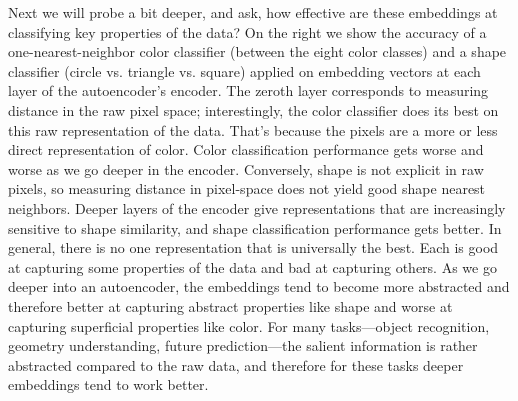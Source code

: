 Next we will probe a bit deeper, and ask, how effective are these embeddings at classifying key properties of the data? On the right we show the accuracy of a one-nearest-neighbor color classifier (between the eight color classes) and a shape classifier (circle vs. triangle vs. square) applied on embedding vectors at each layer of the autoencoder's encoder. The zeroth layer corresponds to measuring distance in the raw pixel space; interestingly, the color classifier does its best on this raw representation of the data. That's because the pixels are a more or less direct representation of color. Color classification performance gets worse and worse as we go deeper in the encoder. Conversely, shape is not explicit in raw pixels, so measuring distance in pixel-space does not yield good shape nearest neighbors. Deeper layers of the encoder give representations that are increasingly sensitive to shape similarity, and shape classification performance gets better. In general, there is no one representation that is universally the best. Each is good at capturing some properties of the data and bad at capturing others. As we go deeper into an autoencoder, the embeddings tend to become more abstracted and therefore better at capturing abstract properties like shape and worse at capturing superficial properties like color. For many tasks—object recognition, geometry understanding, future prediction—the salient information is rather abstracted compared to the raw data, and therefore for these tasks deeper embeddings tend to work better.


